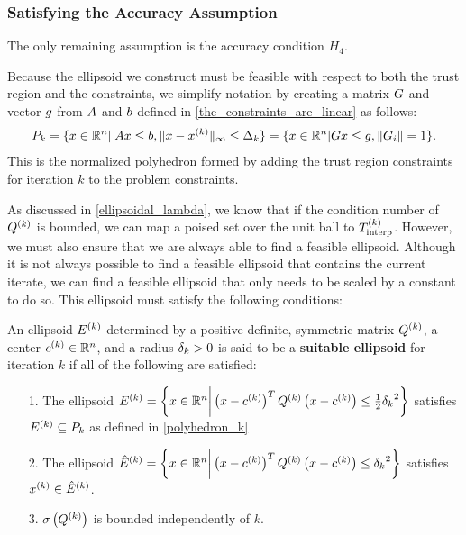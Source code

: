 \subsubsection{Satisfying the Accuracy Assumption}
\label{satisfying_accuracy}
The only remaining assumption is the accuracy condition $H_4$.

Because the ellipsoid we construct must be feasible with respect to both the trust region and the constraints,
we simplify notation by creating a matrix ${G}$ and vector ${g}$ from ${A}$ and ${b}$ defined in \cref{the_constraints_are_linear} as follows:
\begin{align}
{P_k} = \{x \in \mathbb R^n | \; {A} x \le {b}, \|x - x^{(k)}\|_{\infty} \le \Delta_k \} \label{polyhedron_k} 
= \{x \in \mathbb R^n | {G} x \le {g}, \|{{G}}_i\| = 1 \}.
\end{align}
This is the normalized polyhedron formed by adding the trust region constraints for iteration $k$ to the problem constraints.

As discussed in \cref{ellipsoidal_lambda}, we know that if the condition number of ${Q^{(k)}}$ is bounded, 
we can map a poised set over the unit ball to ${T_{\text{interp}}^{(k)}}$.
However, we must also ensure that we are always able to find a feasible ellipsoid.
Although it is not always possible to find a feasible ellipsoid that contains the current iterate,
we can find a feasible ellipsoid that only needs to be scaled by a constant to do so.
This ellipsoid must satisfy the following conditions:

\begin{definition}
\label{define_suitable_ellipsoid}
An ellipsoid ${E^{(k)}}$ determined by a positive definite, symmetric matrix  ${Q^{(k)}}$, a center ${c^{(k)}} \in \mathbb R^n$, and a radius ${\delta_k} > 0$
is said to be a \textbf{suitable ellipsoid} for iteration $k$ if all of the following are satisfied:
\begin{itemize}
\item[1.] The ellipsoid ${E^{(k)}} = \left\{x \in \mathbb R^n \bigg| \left(x - {c^{(k)}}\right)^T{Q^{(k)}}\left(x - {c^{(k)}}\right) \le \frac 1 2 {\delta_k}^2 \right\}$ 
satisfies ${E^{(k)}} \subseteq {P_k}$ as defined in \cref{polyhedron_k}
\item[2.] The ellipsoid ${{\hat E}^{(k)}} = \left\{x \in \mathbb R^n \bigg | \left(x - {c^{(k)}}\right)^T{Q^{(k)}}\left(x - {c^{(k)}}\right) \le  {\delta_k}^2 \right\}$ satisfies $x^{(k)} \in {{\hat E}^{(k)}}$.
\item[3.] ${\sigma} \left({Q^{(k)}}\right)$ is bounded independently of $k$.
\end{itemize}
\end{definition}

